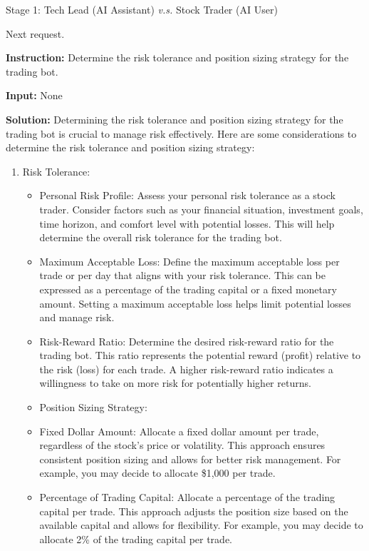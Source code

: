 \begin{AIBoxBreak}{Stage 1: Tech Lead (AI Assistant) \textit{v.s.} Stock Trader (AI User)}
\begin{enumerate}
\begin{itemize}
Next request.

\end{itemize}
\end{enumerate}

\usermsg

\textbf{Instruction:} Determine the risk tolerance and position sizing strategy for the trading bot.

\textbf{Input:} None


\assistantmsg

\textbf{Solution:} Determining the risk tolerance and position sizing strategy for the trading bot is crucial to manage risk effectively. Here are some considerations to determine the risk tolerance and position sizing strategy:

\begin{enumerate}
\item  Risk Tolerance:
\begin{itemize}
\item Personal Risk Profile: Assess your personal risk tolerance as a stock trader. Consider factors such as your financial situation, investment goals, time horizon, and comfort level with potential losses. This will help determine the overall risk tolerance for the trading bot.

\item Maximum Acceptable Loss: Define the maximum acceptable loss per trade or per day that aligns with your risk tolerance. This can be expressed as a percentage of the trading capital or a fixed monetary amount. Setting a maximum acceptable loss helps limit potential losses and manage risk.

\item Risk-Reward Ratio: Determine the desired risk-reward ratio for the trading bot. This ratio represents the potential reward (profit) relative to the risk (loss) for each trade. A higher risk-reward ratio indicates a willingness to take on more risk for potentially higher returns.

\item  Position Sizing Strategy:
\item Fixed Dollar Amount: Allocate a fixed dollar amount per trade, regardless of the stock’s price or volatility. This approach ensures consistent position sizing and allows for better risk management. For example, you may decide to allocate \$1,000 per trade.

\item Percentage of Trading Capital: Allocate a percentage of the trading capital per trade. This approach adjusts the position size based on the available capital and allows for flexibility. For example, you may decide to allocate 2\% of the trading capital per trade.


\end{itemize}
\end{enumerate}
\end{AIBoxBreak}

